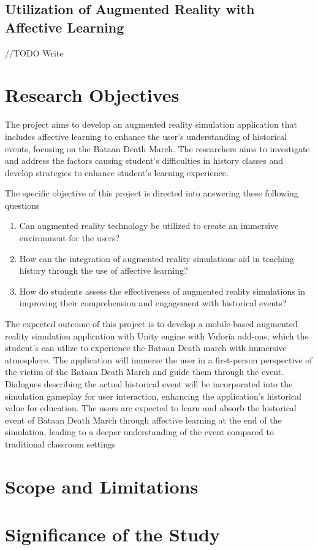 \subsection{Utilization of Augmented Reality with Affective Learning}
//TODO Write


\section{Research Objectives}
The project aims to develop an augmented reality simulation application that includes affective learning to enhance the user's understanding of historical events, focusing on the Bataan Death March. The researchers aims to investigate and address the factors causing student's difficulties in history classes and develop strategies to enhance student's learning experience.

The specific objective of this project is directed into answering these following questions
\begin{enumerate}
    \item Can augmented reality technology be utilized to create an immersive environment for the users?
    \item How can the integration of augmented reality simulations aid in teaching history through the use of affective learning?
    \item How do students assess the effectiveness of augmented reality simulations in improving their comprehension and engagement with historical events? 
\end{enumerate}

The expected outcome of this project is to develop a mobile-based augmented reality simulation application with Unity engine with Vuforia add-ons, which the student's can utlize to experience the Bataan Death march with immersive atmosphere. The application will immerse the user in a first-person perspective of the victim of the Bataan Death March and guide them through the event. Dialogues describing the actual historical event will be incorporated into the simulation gameplay for user interaction, enhancing the application's historical value for education. The users are expected to learn and absorb the historical event of Bataan Death March through affective learning at the end of the simulation, leading to a deeper understanding of the event compared to traditional classroom settings
 
\section{Scope and Limitations}

\section{Significance of the Study}